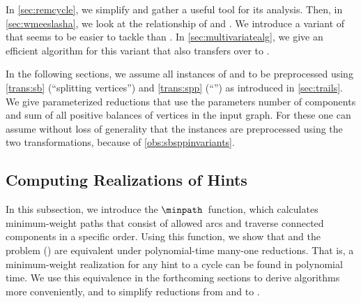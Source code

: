 In \autoref{sec:remcycle}, we simplify \pWMEEAs{} and gather a useful tool for its analysis. Then, in \autoref{sec:wmeeslasha}, we look at the relationship of \pWMEEs{} and \pWMEEAs{}. We introduce a variant of \pWMEEAs{} that seems to be easier to tackle than \pWMEEs{}. In \autoref{sec:multivariatealg}, we give an efficient algorithm for this variant that also transfers over to \pWMEEs{}. 

In the following sections, we assume all instances of \pWMEEs{} and \pWMEEAs{} to be preprocessed using \autoref{trans:sb} (``splitting vertices'') and \autoref{trans:spp} (``\SPP{}'') as introduced in \autoref{sec:trails}. We give parameterized reductions that use the parameters number of components and sum of all positive balances of vertices in the input graph. For these one can assume without loss of generality that the instances are preprocessed using the two transformations, because of \autoref{obs:sbsppinvariants}. 


\subsection{Computing Realizations of Hints}\label{sec:remcycle}
In this subsection, we introduce the $\minpath$~function, which calculates minimum-weight paths that consist of allowed arcs and traverse connected components in a specific order. Using this function, we show that \pWMEEAs{} and the problem \pWMEECLA{} (\pWMEECLAs{}) are equivalent under polynomial-time many-one reductions. That is, a minimum-weight realization for any hint to a cycle can be found in polynomial time. We use this equivalence in the forthcoming sections to derive algorithms more conveniently, and to simplify reductions from and to \pWMEEAs{}.

